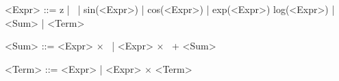 \setlength{\grammarindent}{5em}
\begin{grammar}
	<Expr> ::= z | \CC\ | sin(<Expr>) | cos(<Expr>) | exp(<Expr>)
	\alt log(<Expr>) | <Sum> | <Term>

	<Sum> ::= <Expr> $\times$ \CC\ | <Expr> $\times$ \CC\ + <Sum>

	<Term> ::= <Expr> \textsuperscript{\CC} | <Expr> \textsuperscript{\CC}  $\times$ <Term>
\end{grammar}
